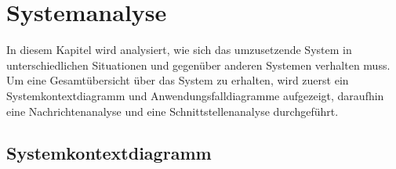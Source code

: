 

\chapter{Systemanalyse}

In diesem Kapitel wird analysiert, wie sich das umzusetzende System in unterschiedlichen Situationen und gegenüber anderen Systemen verhalten muss.
Um eine Gesamtübersicht über das System zu erhalten, wird zuerst ein Systemkontextdiagramm und Anwendungsfalldiagramme aufgezeigt, daraufhin eine Nachrichtenanalyse und eine Schnittstellenanalyse durchgeführt.



\section{Systemkontextdiagramm}
\label{system_context}


